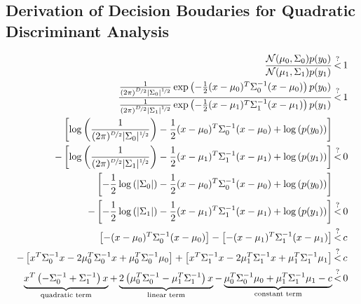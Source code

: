 \documentclass{article}
\DeclareMathOperator*{\equnk}{\overset{?}<}
\begin{document}
\newpage
\begin{appendices}
\section{Derivation of Decision Boudaries for Quadratic Discriminant Analysis}
\begingroup
\allowdisplaybreaks
\begin{align}
    \frac{
        \mathcal{N}(\mu_0, \Sigma_0)  p(y_0) 
    }{
        \mathcal{N}(\mu_1, \Sigma_1)  p(y_1) 
    } &\equnk 1
    \\
    \frac{
        \frac{1}{
        (2\pi)^{\nicefrac{D}{2}} |\Sigma_0|^{\nicefrac{1}{2}}} 
        \exp\left(
            -\frac{1}{2}(x - \mu_0)^T\Sigma_0^{-1}(x-\mu_0)
        \right) p(y_0) 
    }{
        \frac{1}{
        (2\pi)^{\nicefrac{D}{2}} |\Sigma_1|^{\nicefrac{1}{2}}} 
        \exp\left(
            -\frac{1}{2}(x - \mu_1)^T\Sigma_1^{-1}(x-\mu_1)
        \right) p(y_1)
    }
    &\equnk 1
    \\
        \left[ 
            \log{\left(
                \frac{1}{
                    (2\pi)^{\nicefrac{D}{2}} |\Sigma_0|^{\nicefrac{1}{2}}} 
            \right)}
            -\frac{1}{2}(x - \mu_0)^T\Sigma_0^{-1}(x-\mu_0)
            + \log{\left(p(y_0)  \right)}
        \right] \\ \nonumber - \left[
            \log{\left(
                \frac{1}{
                    (2\pi)^{\nicefrac{D}{2}} |\Sigma_1|^{\nicefrac{1}{2}}} 
            \right)}
            -\frac{1}{2}(x - \mu_1)^T\Sigma_1^{-1}(x-\mu_1)
            + \log{\left( p(y_1) \right)}
        \right]
    &\equnk 0
    \\
        \left[ 
            -\frac{1}{2}\log{\left(
                 |\Sigma_0| 
            \right)}
            -\frac{1}{2}(x - \mu_0)^T\Sigma_0^{-1}(x-\mu_0)
            + \log{\left(p(y_0)  \right)}
        \right] \\ \nonumber - \left[
            -\frac{1}{2}\log{\left(
                |\Sigma_1|
            \right)}
            -\frac{1}{2}(x - \mu_1)^T\Sigma_1^{-1}(x-\mu_1)
            + \log{\left( p(y_1) \right)}
        \right]
    &\equnk 0
    \\
        \left[ 
            -(x - \mu_0)^T\Sigma_0^{-1}(x-\mu_0)
        \right]  - \left[
            -(x - \mu_1)^T\Sigma_1^{-1}(x-\mu_1)
        \right]
    &\equnk c
    \\
        -\left[ 
            x^T\Sigma_0^{-1}x
            - 2\mu_0^T\Sigma_0^{-1}x
            + \mu_0^T\Sigma_0^{-1}\mu_0
        \right]  + \left[
            x^T\Sigma_1^{-1}x
            - 2\mu_1^T\Sigma_1^{-1}x
            + \mu_1^T\Sigma_1^{-1}\mu_1
        \right]
    &\equnk c
    \\
        \label{eq:reduce_linear}
        \underbrace{
            x^T \left(
            -\Sigma_0^{-1} + \Sigma_1^{-1}
        \right) x }_{\text{quadratic term}}
        + 
        \underbrace{
        2\left(\mu_0^T\Sigma_0^{-1} - \mu_1^T\Sigma_1^{-1}\right)x}_{\text{linear term}}
        -\underbrace{
         \mu_0^T\Sigma_0^{-1}\mu_0
    + \mu_1^T\Sigma_1^{-1}\mu_1 - c}_{\text{constant term}}
    &\equnk 0
\end{align}
\endgroup

\end{appendices}
\end{document}
